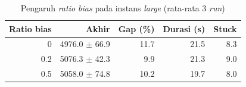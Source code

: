 \begin{table}[H]\centering\small
\caption{Pengaruh \textit{ratio bias} pada instans \textit{large} (rata-rata 3 \textit{run})}\label{tab:sa-large-bias}
\begin{tabular}{r r r r r}
\toprule
\textbf{Ratio bias} & \textbf{Akhir} & \textbf{Gap (\%)} & \textbf{Durasi (s)} & \textbf{Stuck} \\
\midrule
0 & 4976.0 $\pm$ 66.9 & 11.7 & 21.5 & 8.3 \\
0.2 & 5076.3 $\pm$ 42.3 & 9.9 & 21.3 & 9.0 \\
0.5 & 5058.0 $\pm$ 74.8 & 10.2 & 19.7 & 8.0 \\
\bottomrule
\end{tabular}
\end{table}
